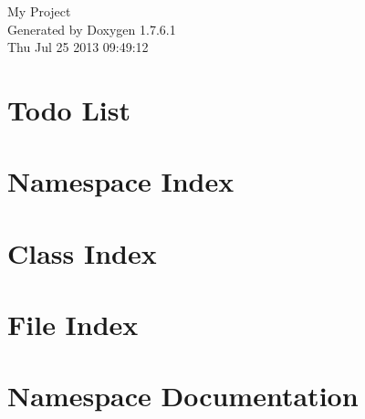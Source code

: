 \documentclass[a4paper]{book}
\begin{document}
\hypersetup{pageanchor=false,citecolor=blue}
\begin{titlepage}
\vspace*{7cm}
\begin{center}
{\Large \-My \-Project }\\
\vspace*{1cm}
{\large \-Generated by Doxygen 1.7.6.1}\\
\vspace*{0.5cm}
{\small Thu Jul 25 2013 09:49:12}\\
\end{center}
\end{titlepage}
\clearemptydoublepage
{}
\tableofcontents
\clearemptydoublepage
{}
\hypersetup{pageanchor=true,citecolor=blue}
\chapter{\-Todo \-List}
\label{todo}
\hypertarget{todo}{}

\chapter{\-Namespace \-Index}

\chapter{\-Class \-Index}

\chapter{\-File \-Index}

\chapter{\-Namespace \-Documentation}













\end{document}
